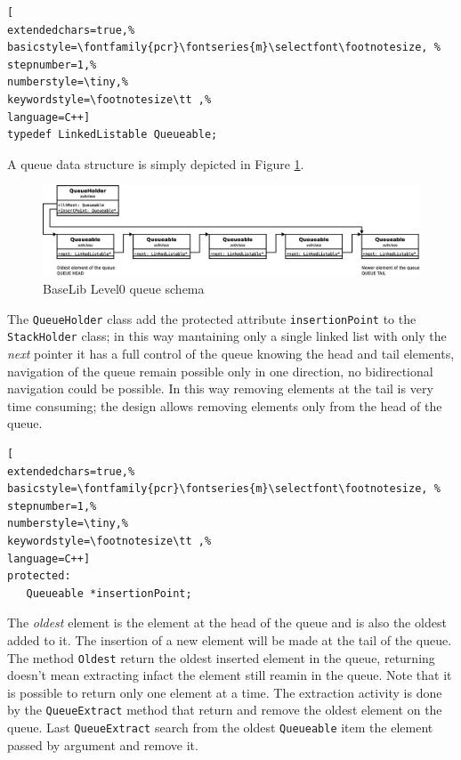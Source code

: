\begin{lstlisting}[
extendedchars=true,%
basicstyle=\fontfamily{pcr}\fontseries{m}\selectfont\footnotesize, %
stepnumber=1,%
numberstyle=\tiny,%
keywordstyle=\footnotesize\tt ,%
language=C++]
typedef LinkedListable Queueable;
\end{lstlisting}

A queue data structure is simply depicted in Figure \ref{f:level0:queue}.

\begin{figure}[h!]
 \begin{center}
  \includegraphics[width=\textwidth]{level0/queue.eps}
  \caption{BaseLib Level0 queue schema}
  \label{f:level0:queue}
 \end{center}
\end{figure}

The \texttt{QueueHolder} class add the protected attribute \texttt{insertionPoint} to the \texttt{StackHolder} class; in this way mantaining only a single linked list with only the \textit{next} pointer it has a full control of the queue knowing the head and tail elements, navigation of the queue remain possible only in one direction, no bidirectional navigation could be possible. In this way removing elements at the tail is very time consuming; the design allows removing elements only from the head of the queue.

\begin{lstlisting}[
extendedchars=true,%
basicstyle=\fontfamily{pcr}\fontseries{m}\selectfont\footnotesize, %
stepnumber=1,%
numberstyle=\tiny,%
keywordstyle=\footnotesize\tt ,%
language=C++]
protected:
   Queueable *insertionPoint;
\end{lstlisting}

The \textit{oldest} element is the element at the head of the queue and is also the oldest added to it. The insertion of a new element will be made at the tail of the queue.\\


The method \texttt{Oldest} return the oldest inserted element in the queue, returning doesn't mean extracting infact the element still reamin in the queue. Note that it is possible to return only one element at a time. The extraction activity is done by the \texttt{QueueExtract} method that return and remove the oldest element on the queue. Last \texttt{QueueExtract} search from the oldest \texttt{Queueable} item the element passed by argument and remove it.\\


